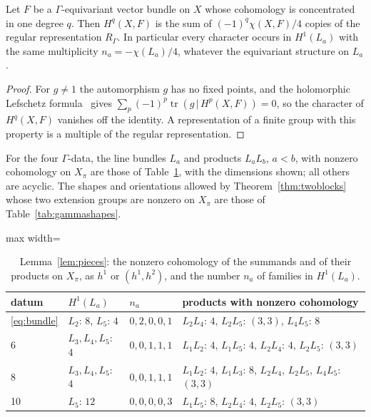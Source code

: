 \begin{lemma}\label{lem:regular}
Let $F$ be a $\Gamma$-equivariant vector bundle on $X$ whose cohomology is
concentrated in one degree $q$. Then $H^q(X,F)$ is the sum of
$(-1)^q\chi(X,F)/4$ copies of the regular representation $R_\Gamma$. In
particular every character occurs in $H^1(L_a)$ with the same multiplicity
$n_a=-\chi(L_a)/4$, whatever the equivariant structure on $L_a$.
\end{lemma}
\begin{proof}
For $g\ne1$ the automorphism $g$ has no fixed points, and the holomorphic
Lefschetz formula~\cite{AB68} gives $\sum_p(-1)^p\operatorname{tr}(g\,|\,
H^p(X,F))=0$, so the character of $H^q(X,F)$ vanishes off the identity.
A representation of a finite group with this property is a multiple of the
regular representation.
\end{proof}

\begin{lemma}\label{lem:pieces}
For the four $\Gamma$-data, the line bundles $L_a$ and products $L_aL_b$,
$a<b$, with nonzero cohomology on $X_\pi$ are those of
Table~\ref{tab:pieces}, with the dimensions shown; all others are acyclic.
The shapes and orientations allowed by Theorem~\ref{thm:twoblocks} whose
two extension groups are nonzero on $X_\pi$ are those of
Table~\ref{tab:gammashapes}.
\end{lemma}

\begin{table}[t]\small\centering
\caption{Lemma~\ref{lem:pieces}: the nonzero cohomology of the summands and
of their products on $X_\pi$, as $h^1$ or $(h^1,h^2)$, and the number $n_a$
of families in $H^1(L_a)$.}\label{tab:pieces}
\begin{adjustbox}{max width=\linewidth}
\begin{tabular}{@{}llll@{}}
\toprule
datum & $H^1(L_a)$ & $n_a$ & products with nonzero cohomology\\\midrule
\eqref{eq:bundle} & $L_2$: $8$, $L_5$: $4$ & $0,2,0,0,1$ & $L_2L_4$: $4$, $L_2L_5$: $(3,3)$, $L_4L_5$: $8$\\
6 & $L_3,L_4,L_5$: $4$ & $0,0,1,1,1$ & $L_1L_2$: $4$, $L_1L_5$: $4$, $L_2L_4$: $4$, $L_2L_5$: $(3,3)$\\
8 & $L_3,L_4,L_5$: $4$ & $0,0,1,1,1$ & $L_1L_2$: $4$, $L_1L_3$: $8$, $L_2L_4$, $L_2L_5$, $L_4L_5$: $(3,3)$\\
10 & $L_5$: $12$ & $0,0,0,0,3$ & $L_1L_5$: $8$, $L_2L_4$: $4$, $L_2L_5$: $(3,3)$\\
\bottomrule
\end{tabular}
\end{adjustbox}
\end{table}


